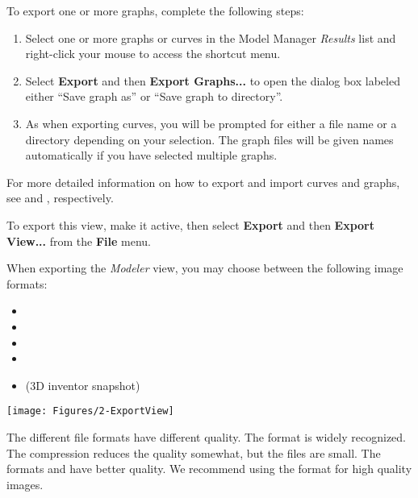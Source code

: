To export one or more graphs, complete the following steps:

\begin{enumerate}
\item Select one or more graphs or curves in the Model Manager {\sl Results}
  list and right-click your mouse to access the shortcut menu.
\item Select \textbf{Export} and then \textbf{Export Graphs...} to open the
  dialog box labeled either ``Save graph as'' or ``Save graph to directory''.
\item As when exporting curves, you will be prompted for either a file name
  or a directory depending on your selection. The graph files will be given
  names automatically if you have selected multiple graphs.
\end{enumerate}

For more detailed information on how to export and import curves and
graphs, see 
and ,
respectively.



\noindent
\begin{minipage}{0.41\textwidth}
  \setlength{\parskip}{1mm}
  \raggedright
  To export this view, make it active, then select \textbf{Export} and then
  \textbf{Export View...} from the \textbf{File} menu.

  When exporting the {\sl Modeler} view, you may choose between the following
  image formats:

  \begin{itemize}
  \item{}
  \item{}
  \item{}
  \item{}
  \item{} \small(3D inventor snapshot)
  \end{itemize}
\end{minipage}%
\begin{minipage}{0.59\textwidth}
  \raggedleft
  \texttt{[image: Figures/2-ExportView]}
\end{minipage}

\vskip5mm
The different file formats have different quality.
The format  is widely recognized.
The compression reduces the quality somewhat, but the files are small.
The formats  and  have better quality.
We recommend using the  format for high quality images.

